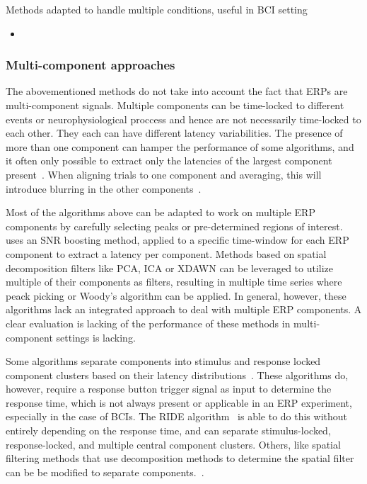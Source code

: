 Methods adapted to handle multiple conditions, useful in BCI setting
\begin{itemize}
	\item \cite{Kim2020}
\end{itemize}

\subsubsection{Multi-component approaches}
The abovementioned methods do not take into account the fact that  ERPs are multi-component signals. Multiple components can be time-locked to different events or neurophysiological proccess and hence are not necessarily
time-locked to each other. They each can have different latency
variabilities. The presence of more than one component can hamper the
performance of some algorithms, and it often only possible to extract only the
latencies of the largest component present~\cite{Ouyang2017}. When aligning trials
to one component and averaging, this will introduce blurring in the other
components~\cite{Ouyang2020}.

Most of the algorithms above can be adapted to work on multiple ERP components
by carefully selecting peaks or pre-determined regions of interest.
\cite{hardiansyah2020single} uses an SNR boosting method, applied to a specific
time-window for each ERP component to extract a latency per component.
Methods based on spatial decomposition filters like PCA, ICA or XDAWN can be leveraged
to utilize multiple of their components as filters, resulting in multiple time
series where peack picking or Woody's algorithm can be applied. In general,
however, these algorithms lack an integrated approach to deal with multiple
ERP components. A clear evaluation is lacking of the performance of these
methods in
multi-component settings is lacking.

Some algorithms separate components into stimulus and response locked component clusters based on their
latency distributions~\cite{jung2001analysis, Takeda2008,
	Zhang1998, Yin2009}. These algorithms do, however, require a response
button trigger signal as input to determine the response time, which is
not always present or applicable in an ERP experiment, especially in
the case of BCIs.
The RIDE algorithm~\cite{Ouyang2011, Ouyang2015,
	Wang2015, Ouyang2016, Ouyang2020} is able to do this without entirely depending on
the response time, and can separate stimulus-locked, response-locked,
and multiple central component clusters. Others, like spatial filtering methods that use
decomposition methods to determine the spatial filter can be be modified to separate
components.~\cite{Ouyang2017}.

